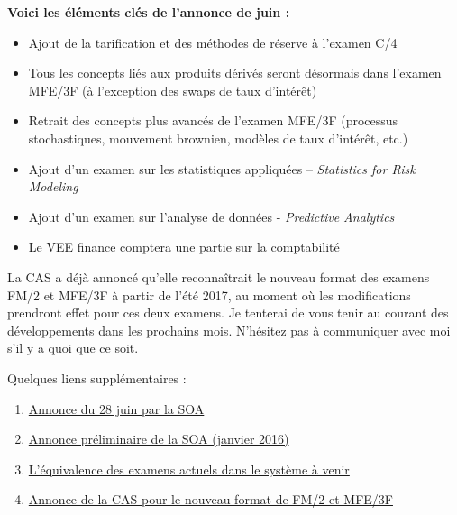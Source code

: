\documentclass[11pt,french]{article}
\begin{document}
\textbf{Voici les éléments clés de l’annonce de juin :}
\begin{itemize}
\item Ajout de la tarification et des méthodes de réserve à l’examen C/4
\item Tous les concepts liés aux produits dérivés seront désormais dans l'examen MFE/3F (à l'exception des swaps de taux d'intérêt)
\item Retrait des concepts plus avancés de l’examen MFE/3F (processus stochastiques, mouvement brownien, modèles de taux d’intérêt, etc.)
\item Ajout d’un examen sur les statistiques appliquées – \emph{Statistics for Risk Modeling}  
\item Ajout d’un examen sur l’analyse de données - \emph{Predictive Analytics}
\item Le VEE finance comptera une partie sur la comptabilité 
\end{itemize}
\vspace{\baselineskip} 

La CAS a déjà annoncé qu’elle reconnaîtrait le nouveau format des examens FM/2 et MFE/3F à partir de l’été 2017, au moment où les modifications prendront effet pour ces deux examens. Je tenterai de vous tenir au courant des développements dans les prochains mois. N’hésitez pas à communiquer avec moi s’il y a quoi que ce soit.\vspace{\baselineskip} 

Quelques liens supplémentaires :
\begin{enumerate}
\item \href{https://www.soa.org/Education/General-Info/2016-asa-cera-curriculum-changes.aspx}{Annonce du 28 juin par la SOA}
\item \href{https://soa.qualtrics.com/CP/File.php?F=F_0TDd9bj143TrCW9}{Annonce préliminaire de la SOA (janvier 2016)}
\item \href{https://www.soa.org/Education/General-Info/2016-transition-rules-asa-candidated.aspx}{L’équivalence des examens actuels dans le système à venir}
\item \href{http://www.casact.org/press/index.cfm?fa=viewArticle&articleID=3273}{Annonce de la CAS pour le nouveau format de FM/2 et MFE/3F}
\end{enumerate}
\end{document}
